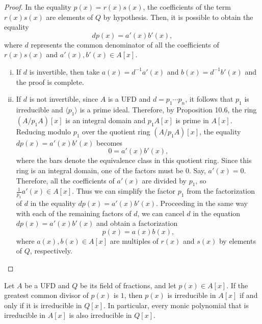 \documentclass[11pt,a4paper]{article}
\begin{document}
\begin{proof}
In the equality $p(x) = r(x)s(x)$, the coefficients of the term $r(x)s(x)$ are elements of $Q$ by hypothesis. Then, it is possible to obtain the equality
\[
dp(x) = a'(x)b'(x),
\]
where $d$ represents the common denominator of all the coefficients of $r(x)s(x)$ and $a'(x), b'(x) \in A[x]$.

\begin{enumerate}[i)]
    \item If $d$ is invertible, then take $a(x) = d^{-1}a'(x)$ and $b(x) = d^{-1}b'(x)$ and the proof is complete.

    \item If $d$ is not invertible, since $A$ is a UFD and $d = p_1 \cdots p_n$, it follows that $p_1$ is irreducible and $\langle p_1 \rangle$ is a prime ideal. Therefore, by Proposition 10.6, the ring $(A/p_1A)[x]$ is an integral domain and $p_1A[x]$ is prime in $A[x]$. Reducing modulo $p_1$ over the quotient ring $(A/p_1A)[x]$, the equality $dp(x) = a'(x)b'(x)$ becomes
    \[
    0 = a'(x)b'(x),
    \]
    where the bars denote the equivalence class in this quotient ring. Since this ring is an integral domain, one of the factors must be $0$. Say, $a'(x) = 0$. Therefore, all the coefficients of $a'(x)$ are divided by $p_1$, so $\frac{1}{p_1}a'(x) \in A[x]$. Thus we can simplify the factor $p_1$ from the factorization of $d$ in the equality $dp(x) = a'(x)b'(x)$. Proceeding in the same way with each of the remaining factors of $d$, we can cancel $d$ in the equation $dp(x) = a'(x)b'(x)$ and obtain a factorization
    \[
    p(x) = a(x)b(x),
    \]
    where $a(x), b(x) \in A[x]$ are multiples of $r(x)$ and $s(x)$ by elements of $Q$, respectively.
\end{enumerate}
\end{proof}

\begin{corollary}[10.2]
Let $A$ be a UFD and $Q$ be its field of fractions, and let $p(x) \in A[x]$. If the greatest common divisor of $p(x)$ is $1$, then $p(x)$ is irreducible in $A[x]$ if and only if it is irreducible in $Q[x]$. In particular, every monic polynomial that is irreducible in $A[x]$ is also irreducible in $Q[x]$.
\end{corollary}
\end{document}
